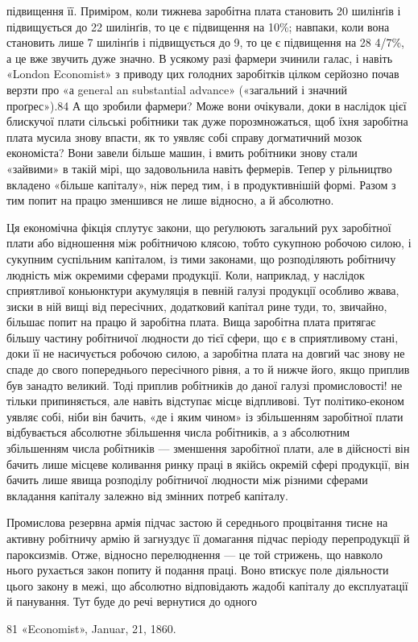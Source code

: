\parcont{}  %
підвищення її. Приміром, коли тижнева заробітна плата становить
20 шилінґів і підвищується до 22 шилінґів, то це є підвищення
на 10\%; навпаки, коли вона становить лише 7 шилінґів
і підвищується до 9, то це є підвищення на 28 4/7\%, а це вже
звучить дуже значно. В усякому разі фармери зчинили галас,
і навіть «London Economist» з приводу цих голодних заробітків
цілком серйозно почав верзти про «а general an substantial
advance» («загальний і значний проґрес»).84 А що зробили
фармери? Може вони очікували, доки в наслідок цієї блискучої
плати сільські робітники так дуже порозмножаться, щоб їхня
заробітна плата мусила знову впасти, як то уявляє собі справу
догматичний мозок економіста? Вони завели більше машин,
і вмить робітники знову стали «зайвими» в такій мірі, що задовольнила
навіть фермерів. Тепер у рільництво вкладено
«більше капіталу», ніж перед тим, і в продуктивнішій формі.
Разом з тим попит на працю зменшився не лише відносно,
а й абсолютно.

Ця економічна фікція сплутує закони, що реґулюють загальний
рух заробітної плати або відношення між робітничою клясою,
тобто сукупною робочою силою, і сукупним суспільним капіталом,
із тими законами, що розподіляють робітничу людність
між окремими сферами продукції. Коли, наприклад, у наслідок
сприятливої коньюнктури акумуляція в певній галузі продукції
особливо жвава, зиски в ній вищі від пересічних, додатковий
капітал рине туди, то, звичайно, більшає попит на працю й заробітна
плата. Вища заробітна плата притягає більшу частину
робітничої людности до тієї сфери, що є в сприятливому стані,
доки її не насичується робочою силою, а заробітна плата на довгий
час знову не спаде до свого попереднього пересічного рівня,
а то й нижче його, якщо приплив був занадто великий. Тоді
приплив робітників до даної галузі промисловості! не тільки
припиняється, але навіть відступає місце відпливові. Тут політико-економ
уявляє собі, ніби він бачить, «де і яким чином»
із збільшенням заробітної плати відбувається абсолютне збільшення
числа робітників, а з абсолютним збільшенням числа робітників
— зменшення заробітної плати, але в дійсності він бачить
лише місцеве коливання ринку праці в якійсь окремій сфері
продукції, він бачить лише явища розподілу робітничої людности
між різними сферами вкладання капіталу залежно від змінних
потреб капіталу.

Промислова резервна армія підчас застою й середнього процвітання
тисне на активну робітничу армію й загнуздує її домагання
підчас періоду перепродукції й пароксизмів. Отже, відносно
перелюднення — це той стрижень, що навколо нього рухається
закон попиту й подання праці. Воно втискує поле діяльности
цього закону в межі, що абсолютно відповідають жадобі капіталу
до експлуатації й панування. Тут буде до речі вернутися до одного

81 «Economist», Januar, 21, 1860.
\parbreak{}  %
